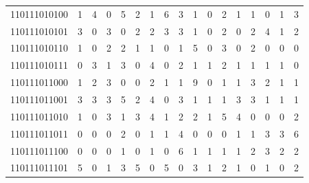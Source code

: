 \documentclass[10pt,a4paper]{article}
\begin{document}
\begin{longtable}{ |c|c|c|c|c|c|c|c|c|c|c|c|c|c|c|c|c| }
    110111010100              & 1                            & 4                                & 0                            & 5                              & 2   & 1   & 6   & 3   & 1   & 0   & 2   & 1   & 1   & 0   & 1   & 3   \\
    110111010101              & 3                            & 0                                & 3                            & 0                              & 2   & 2   & 3   & 3   & 1   & 0   & 2   & 0   & 2   & 4   & 1   & 2   \\
    110111010110              & 1                            & 0                                & 2                            & 2                              & 1   & 1   & 0   & 1   & 5   & 0   & 3   & 0   & 2   & 0   & 0   & 0   \\
    110111010111              & 0                            & 3                                & 1                            & 3                              & 0   & 4   & 0   & 2   & 1   & 1   & 2   & 1   & 1   & 1   & 1   & 0   \\
    110111011000              & 1                            & 2                                & 3                            & 0                              & 0   & 2   & 1   & 1   & 9   & 0   & 1   & 1   & 3   & 2   & 1   & 1   \\
    110111011001              & 3                            & 3                                & 3                            & 5                              & 2   & 4   & 0   & 3   & 1   & 1   & 1   & 3   & 3   & 1   & 1   & 1   \\
    110111011010              & 1                            & 0                                & 3                            & 1                              & 3   & 4   & 1   & 2   & 2   & 1   & 5   & 4   & 0   & 0   & 0   & 2   \\
    110111011011              & 0                            & 0                                & 0                            & 2                              & 0   & 1   & 1   & 4   & 0   & 0   & 0   & 1   & 1   & 3   & 3   & 6   \\
    110111011100              & 0                            & 0                                & 0                            & 1                              & 0   & 1   & 0   & 6   & 1   & 1   & 1   & 1   & 2   & 3   & 2   & 2   \\
    110111011101              & 5                            & 0                                & 1                            & 3                              & 5   & 0   & 5   & 0   & 3   & 1   & 2   & 1   & 0   & 1   & 0   & 2   \\

\end{longtable}
\end{document}
